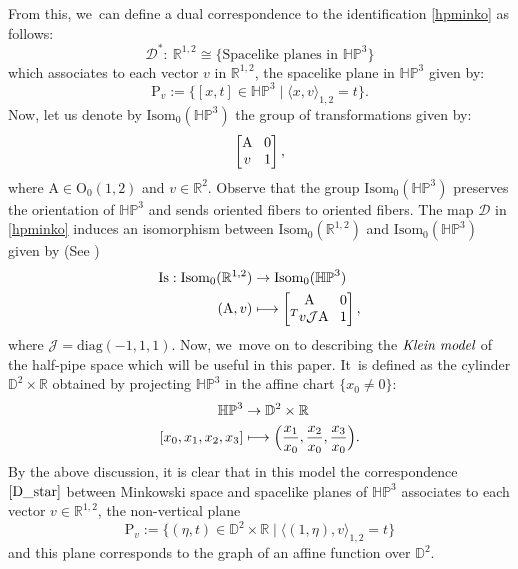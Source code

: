 \documentclass[JEP,XML,SOM,Unicode,NoEqCountersInSection, NoFloatCountersInSection,published]{cedram}
\newcommand\mto{\mathchoice{\longmapsto}{\mapsto}{\mapsto}{\mapsto}}
\theoremstyle{plain}
\theoremstyle{definition}
\newcommand{\minko}{\mathbb{R}^{1,2}}
\newcommand{\HP}{\mathbb{HP}^3}
\newcommand{\isom}{\mathrm{Isom}_0}
\newcommand{\inner}[1] {\langle #1 \rangle}
\begin{document}
From this, we~can define a dual correspondence to the identification \eqref{hpminko} as follows:
\begin{equation}\label{D_star}
\mathcal{D}^*: \ \minko\cong\{\text{Spacelike planes in } \HP \}
\end{equation}
which associates to each vector $v$ in $\minko$, the spacelike plane in $\HP$ given by:
\[
\mathrm{P}_v:=\{[x,t]\in\HP \mid \inner{x,v}_{1,2}=t \}.
\]
Now, let us denote by $\isom(\HP)$ the group of transformations given by:
\[\arraycolsep4pt
\begin{bmatrix}
\mathrm{A} & 0 \\
v & 1
\end{bmatrix},
\]
where $\mathrm{A}\in \mathrm{O}_{0}(1,2)$ and $v\in \mathbb{R}^2$. Observe that the group $\isom(\HP)$ preserves the orientation of $\HP$ and sends oriented fibers to oriented fibers. The map $\mathcal{D}$ in \eqref{hpminko} induces an isomorphism between
$\isom(\mathbb{R}^{1,2})$ and $\isom(\HP)$ given by (See \cite[\S 2.8]{riolo_seppi})
\begin{equation}\label{groupeduality}
\begin{aligned}
\mathrm{Is}:\isom(\mathbb{R}^{1,2}) & \to \isom(\HP) \\
(\mathrm{A},v) & \mto\arraycolsep4pt \begin{bmatrix}
\mathrm{A} & 0 \\
^T v\mathcal{J}\mathrm{A} & 1
\end{bmatrix},
\end{aligned}
\end{equation}
where $\mathcal{J}=\mathrm{diag}(-1,1,1)$.
Now, we~move on to describing the $\emph{Klein model}$ of the half-pipe space which will be useful in this paper. It~is defined as the cylinder $\mathbb{D}^2\times\mathbb{R}$ obtained by projecting $\HP$ in the affine chart $\{x_0\neq 0\}$:
\begin{equation}\label{7}
\begin{aligned}
\HP & \to \mathbb{D}^2\times\mathbb{R} \\
[x_0,x_1,x_2,x_3] & \mto \Bigl(\frac{x_1}{x_0},\frac{x_2}{x_0},\frac{x_3}{x_0}\Bigr).
\end{aligned}
\end{equation}
By the above discussion, it is clear that in this model the correspondence $\eqref{D_star}$ between Minkowski space and spacelike planes of $\HP$ associates to each vector $v\in\minko$, the non-vertical plane
\begin{equation}\label{formule_dual_plan}
\mathrm{P}_v:=\{(\eta,t)\in\mathbb{D}^2\times\mathbb{R} \mid \langle (1,\eta),v \rangle_{1,2}=t \}\end{equation} and this plane corresponds to the graph of an affine function over $\mathbb{D}^2$.
\end{document}
